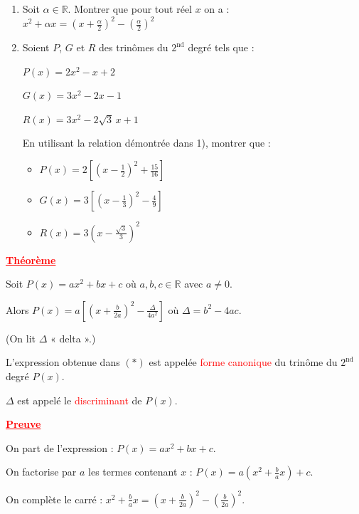 \documentclass[12pt,a4paper]{article}
\begin{document}
\begin{enumerate}
\item Soit $\alpha \in \mathbb{R}$. Montrer que pour tout réel $x$ on a :
\(
x^2+\alpha x=\left(x+\frac{\alpha}{2}\right)^2-\left(\frac{\alpha}{2}\right)^2
\)

\item Soient $P$, $G$ et $R$ des trinômes du $2^{\text{nd}}$ degré tels que :

\(
P(x)=2x^2-x+2
\)

\(
G(x)=3x^2-2x-1
\)

\(
R(x)=3x^2-2\sqrt{3}\,x+1
\)

En utilisant la relation démontrée dans 1), montrer que :

\begin{itemize}
\item[a)] $P(x)=2\left[\left(x-\frac{1}{2}\right)^2+\frac{15}{16}\right]$
\item[b)] $G(x)=3\left[\left(x-\frac{1}{3}\right)^2-\frac{4}{9}\right]$
\item[c)] $R(x)=3\left(x-\frac{\sqrt{3}}{3}\right)^2$
\end{itemize}

\end{enumerate}


\noindent
\textcolor{red}{\underline{\textbf{Théorème}}}

\medskip

Soit 
\(
P(x)=ax^2+bx+c
\)
où $a,b,c\in\mathbb{R}$ avec $a\neq0$.

Alors
\(
P(x)=a\left[\left(x+\frac{b}{2a}\right)^2-\frac{\Delta}{4a^2}\right]
\)
où
\(
\Delta=b^2-4ac.
\)

(On lit $\Delta$ « delta ».)

\medskip

L’expression obtenue dans $(*)$ est appelée \textcolor{red}{forme canonique} du trinôme du $2^{\text{nd}}$ degré $P(x)$.

\medskip

$\Delta$ est appelé le \textcolor{red}{discriminant} de $P(x)$.

\bigskip
\textcolor{red}{\underline{\textbf{Preuve}}}

\medskip

On part de l’expression :
\(
P(x)=ax^2+bx+c.
\)

On factorise par $a$ les termes contenant $x$ :
\(
P(x)=a\left(x^2+\frac{b}{a}x\right)+c.
\)

On complète le carré :
\(
x^2+\frac{b}{a}x
=
\left(x+\frac{b}{2a}\right)^2-\left(\frac{b}{2a}\right)^2.
\)
\end{document}
